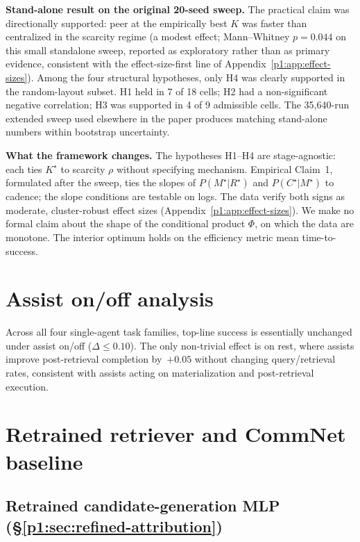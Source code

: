 \documentclass{article}
\begin{document}
\textbf{Stand-alone result on the original 20-seed sweep.}
The practical claim was directionally supported: peer at the empirically best $K$ was faster than centralized in the scarcity regime (a modest effect; Mann--Whitney $p{=}0.044$ on this small standalone sweep, reported as exploratory rather than as primary evidence, consistent with the effect-size-first line of Appendix~\ref{p1:app:effect-sizes}). Among the four structural hypotheses, only H4 was clearly supported in the random-layout subset. H1 held in 7 of 18 cells; H2 had a non-significant negative correlation; H3 was supported in 4 of 9 admissible cells. The 35{,}640-run extended sweep used elsewhere in the paper produces matching stand-alone numbers within bootstrap uncertainty.

\textbf{What the framework changes.}
The hypotheses H1--H4 are stage-agnostic: each ties $K^\star$ to scarcity $\rho$ without specifying mechanism. Empirical Claim~1, formulated after the sweep, ties the slopes of $P(M^\star|R^\star)$ and $P(C^\star|M^\star)$ to cadence; the slope conditions are testable on logs. The data verify both signs as moderate, cluster-robust effect sizes (Appendix~\ref{p1:app:effect-sizes}). We make no formal claim about the shape of the conditional product $\Phi$, on which the data are monotone. The interior optimum holds on the efficiency metric mean time-to-success.

\section{Assist on/off analysis}
\label{p1:app:assist}

Across all four single-agent task families, top-line success is essentially unchanged under assist on/off ($\Delta \le 0.10$). The only non-trivial effect is on rest, where assists improve post-retrieval completion by~$+0.05$ without changing query/retrieval rates, consistent with assists acting on materialization and post-retrieval execution.

\section{Retrained retriever and CommNet baseline}
\label{p1:app:learned-baselines}

\subsection{Retrained candidate-generation MLP (\S\ref{p1:sec:refined-attribution})}
\end{document}
